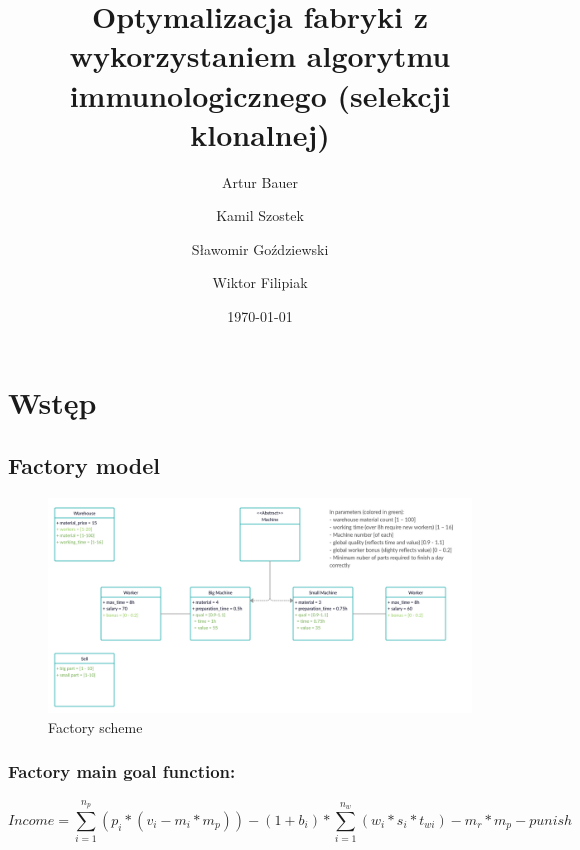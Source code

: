 \documentclass[a4paper]{article}
\title{Optymalizacja fabryki z wykorzystaniem algorytmu immunologicznego (selekcji klonalnej)}
\author{Artur Bauer \and Kamil Szostek \and Sławomir Goździewski \and Wiktor Filipiak}
\date{\today}
\begin{document}


\tableofcontents

\newpage
\section{Wstęp}
\subsection{Factory model}\label{factory}

\begin{figure}[ht]
\centering
\includegraphics[width=.7\textwidth]{Factory_scheme.png}
\caption{Factory scheme}
\end{figure}

\subsubsection{Factory main goal function:}\label{factory-main-goal-function}

$$Income = \sum^{n_p}_{i=1}(p_i*(v_i-m_i*m_p)) - (1+b_i)*\sum^{n_w}_{i = 1}(w_i*s_i *t_{wi}) - m_r*m_p - punish$$
\end{document}
